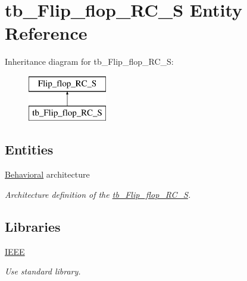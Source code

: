 \hypertarget{classtb___flip__flop___r_c___s}{}\section{tb\+\_\+\+Flip\+\_\+flop\+\_\+\+R\+C\+\_\+S Entity Reference}
\label{classtb___flip__flop___r_c___s}
Inheritance diagram for tb\+\_\+\+Flip\+\_\+flop\+\_\+\+R\+C\+\_\+S\+:\begin{figure}[H]
\begin{center}
\leavevmode
\includegraphics[height=2.000000cm]{classtb___flip__flop___r_c___s}
\end{center}
\end{figure}
\subsection*{Entities}
\begin{DoxyCompactItemize}
\item 
\hyperlink{classtb___flip__flop___r_c___s_1_1_behavioral}{Behavioral} architecture
\begin{DoxyCompactList}\small\item\em Architecture definition of the \hyperlink{classtb___flip__flop___r_c___s}{tb\+\_\+\+Flip\+\_\+flop\+\_\+\+R\+C\+\_\+S}. \end{DoxyCompactList}\end{DoxyCompactItemize}
\subsection*{Libraries}
 \begin{DoxyCompactItemize}
\item 
\hyperlink{classtb___flip__flop___r_c___s_ae4f03c286607f3181e16b9aa12d0c6d4}{I\+E\+EE} \hypertarget{classtb___flip__flop___r_c___s_ae4f03c286607f3181e16b9aa12d0c6d4}{}\label{classtb___flip__flop___r_c___s_ae4f03c286607f3181e16b9aa12d0c6d4}

\begin{DoxyCompactList}\small\item\em Use standard library. \end{DoxyCompactList}\end{DoxyCompactItemize}

